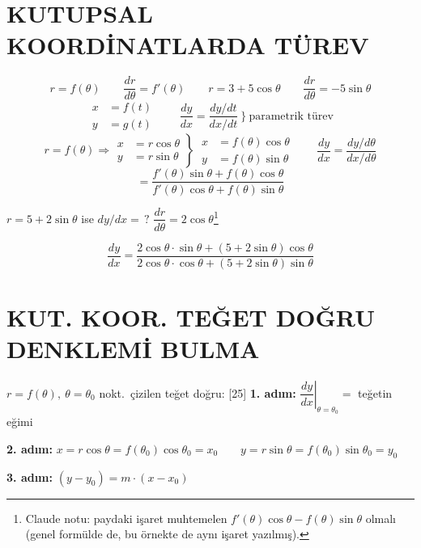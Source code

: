 \documentclass[11pt,a4paper]{article}
\begin{document}
\section{KUTUPSAL KOORDİNATLARDA TÜREV}
\[ r=f(\theta)\qquad \frac{dr}{d\theta}=f'(\theta)\qquad r=3+5\cos\theta\qquad \frac{dr}{d\theta}=-5\sin\theta \]
\[ \begin{aligned}x&=f(t)\\ y&=g(t)\end{aligned}\qquad \frac{dy}{dx}=\frac{dy/dt}{dx/dt}\ \Big\}\ \text{parametrik türev} \]
\[ r=f(\theta)\Longrightarrow\left.\begin{aligned}x&=r\cos\theta\\ y&=r\sin\theta\end{aligned}\right\}\ \left.\begin{aligned}x&=f(\theta)\cos\theta\\ y&=f(\theta)\sin\theta\end{aligned}\right.\qquad \frac{dy}{dx}=\frac{dy/d\theta}{dx/d\theta} \]
\[ =\frac{f'(\theta)\sin\theta+f(\theta)\cos\theta}{f'(\theta)\cos\theta+f(\theta)\sin\theta} \]
\begin{ornek}
$r=5+2\sin\theta$ ise $dy/dx=\,?$ \quad $\dfrac{dr}{d\theta}=2\cos\theta$\footnote{Claude notu: paydaki işaret muhtemelen $f'(\theta)\cos\theta-f(\theta)\sin\theta$ olmalı (genel formülde de, bu örnekte de aynı işaret yazılmış).}
\end{ornek}
\[ \frac{dy}{dx}=\frac{2\cos\theta\cdot\sin\theta+(5+2\sin\theta)\cos\theta}{2\cos\theta\cdot\cos\theta+(5+2\sin\theta)\sin\theta} \]

\section{KUT. KOOR. TEĞET DOĞRU DENKLEMİ BULMA}
$r=f(\theta),\ \theta=\theta_0$ nokt.\ çizilen teğet doğru:
[25]
\noindent\textbf{1. adım:} $\left.\dfrac{dy}{dx}\right|_{\theta=\theta_0}=$ teğetin eğimi

\noindent\textbf{2. adım:} $x=r\cos\theta=f(\theta_0)\cos\theta_0=x_0\qquad y=r\sin\theta=f(\theta_0)\sin\theta_0=y_0$

\noindent\textbf{3. adım:} $(y-y_0)=m\cdot(x-x_0)$
\end{document}

